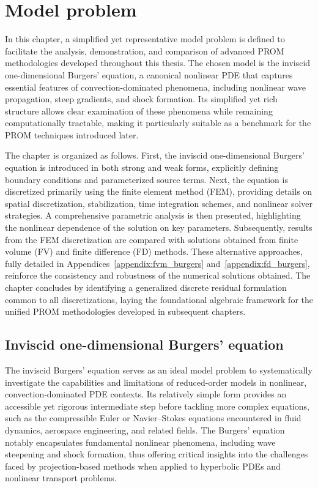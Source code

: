 \chapter{Model problem}
\label{sec:model_problem}

In this chapter, a simplified yet representative model problem is defined to facilitate the analysis, demonstration, and comparison of advanced PROM methodologies developed throughout this thesis. The chosen model is the inviscid one-dimensional Burgers' equation, a canonical nonlinear PDE that captures essential features of convection-dominated phenomena, including nonlinear wave propagation, steep gradients, and shock formation. Its simplified yet rich structure allows clear examination of these phenomena while remaining computationally tractable, making it particularly suitable as a benchmark for the PROM techniques introduced later.

The chapter is organized as follows. First, the inviscid one-dimensional Burgers' equation is introduced in both strong and weak forms, explicitly defining boundary conditions and parameterized source terms. Next, the equation is discretized primarily using the finite element method (FEM), providing details on spatial discretization, stabilization, time integration schemes, and nonlinear solver strategies. A comprehensive parametric analysis is then presented, highlighting the nonlinear dependence of the solution on key parameters. Subsequently, results from the FEM discretization are compared with solutions obtained from finite volume (FV) and finite difference (FD) methods. These alternative approaches, fully detailed in Appendices~\ref{appendix:fvm_burgers} and~\ref{appendix:fd_burgers}, reinforce the consistency and robustness of the numerical solutions obtained. The chapter concludes by identifying a generalized discrete residual formulation common to all discretizations, laying the foundational algebraic framework for the unified PROM methodologies developed in subsequent chapters.

\section{Inviscid one-dimensional Burgers' equation}

The inviscid Burgers' equation serves as an ideal model problem to systematically investigate the capabilities and limitations of reduced-order models in nonlinear, convection-dominated PDE contexts. Its relatively simple form provides an accessible yet rigorous intermediate step before tackling more complex equations, such as the compressible Euler or Navier–Stokes equations encountered in fluid dynamics, aerospace engineering, and related fields. The Burgers' equation notably encapsulates fundamental nonlinear phenomena, including wave steepening and shock formation, thus offering critical insights into the challenges faced by projection-based methods when applied to hyperbolic PDEs and nonlinear transport problems.

